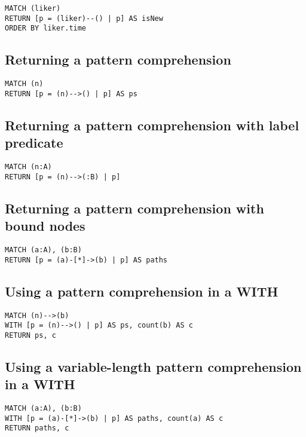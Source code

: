 \begin{lstlisting}
MATCH (liker)
RETURN [p = (liker)--() | p] AS isNew
ORDER BY liker.time
\end{lstlisting}

\subsection{Returning a pattern comprehension}

\begin{lstlisting}
MATCH (n)
RETURN [p = (n)-->() | p] AS ps
\end{lstlisting}

\subsection{Returning a pattern comprehension with label predicate}

\begin{lstlisting}
MATCH (n:A)
RETURN [p = (n)-->(:B) | p]
\end{lstlisting}

\subsection{Returning a pattern comprehension with bound nodes}

\begin{lstlisting}
MATCH (a:A), (b:B)
RETURN [p = (a)-[*]->(b) | p] AS paths
\end{lstlisting}

\subsection{Using a pattern comprehension in a WITH}

\begin{lstlisting}
MATCH (n)-->(b)
WITH [p = (n)-->() | p] AS ps, count(b) AS c
RETURN ps, c
\end{lstlisting}

\subsection{Using a variable-length pattern comprehension in a WITH}

\begin{lstlisting}
MATCH (a:A), (b:B)
WITH [p = (a)-[*]->(b) | p] AS paths, count(a) AS c
RETURN paths, c
\end{lstlisting}

